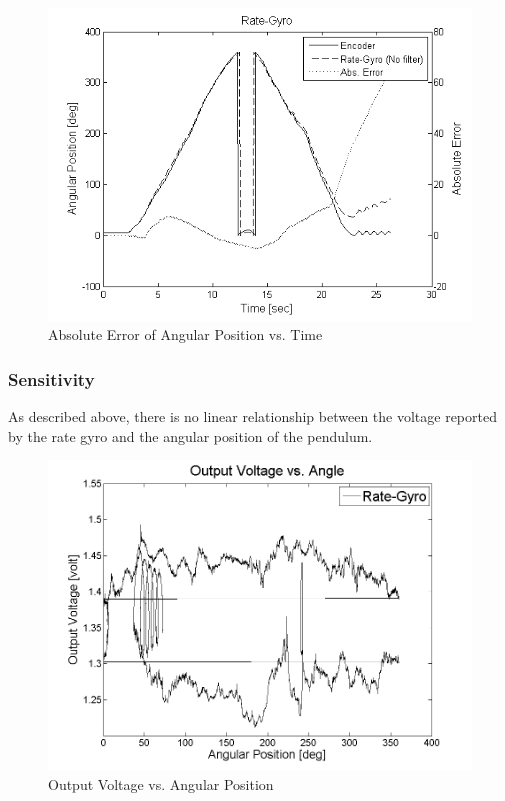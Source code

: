 \documentclass{article}
\theoremstyle{plain}
\theoremstyle{definition}
\theoremstyle{remark}
\begin{document}
\begin{figure}[hbt]
\begin{center}
\includegraphics[width = 13cm]{Gyro_AbsError.png}
\caption{Absolute Error of Angular Position vs. Time}
\label{Gyro_AbsError}
\end{center}
\end{figure}


\subsubsection{Sensitivity}

As described above, there is no linear relationship between the voltage reported by the rate gyro and the angular position of the pendulum.  

\begin{figure}[hbt]
\begin{center}
\includegraphics[width =12cm]{Gyro_Vol_vs_Angle.png}
\caption{Output Voltage vs. Angular Position}
\label{Gyro_Vol_vs_Angle}
\end{center}
\end{figure}
\end{document}
